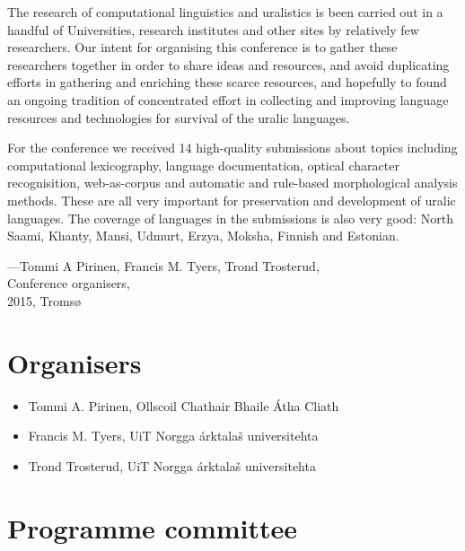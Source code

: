 \documentclass[b5paper]{book}
\begin{document}
The research of computational linguistics and uralistics is been carried out
in a handful of Universities, research institutes and other sites by
relatively few researchers. Our intent for organising this conference is to
gather these researchers together in order to share ideas and resources, and
avoid duplicating efforts in gathering and enriching these scarce resources,
and hopefully to found an ongoing tradition of concentrated effort in
collecting and improving language resources and technologies for survival
of the uralic languages.

For the conference we received 14 high-quality submissions about topics
including computational lexicography, language documentation, optical character
recognisition, web-as-corpus and automatic and rule-based morphological
analysis methods.  These are all very important for preservation and
development of uralic languages. The coverage of languages in the submissions
is also very good: North Saami, Khanty, Mansi, Udmurt, Erzya, Moksha, Finnish
and Estonian. 

\noindent ---Tommi A Pirinen, Francis M. Tyers, Trond Trosterud,\\
Conference organisers,\\
2015, Tromsø


\chapter*{Organisers}

\begin{itemize}
    \item Tommi A. Pirinen, Ollscoil Chathair Bhaile Átha Cliath
    \item Francis M. Tyers, UiT Norgga árktalaš universitehta
    \item Trond Trosterud, UiT Norgga árktalaš universitehta
\end{itemize}

\chapter*{Programme committee}
\end{document}
